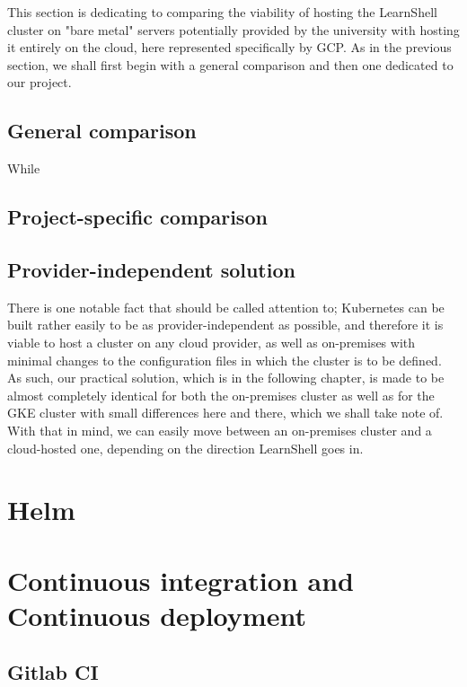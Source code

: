 \documentclass[thesis=B,english]{FITthesis}[2019/12/23]
\begin{document}
This section is dedicating to comparing the viability of hosting the LearnShell cluster on "bare metal" servers potentially provided by the university with hosting it entirely on the cloud, here represented specifically by GCP. As in the previous section, we shall first begin with a general comparison and then one dedicated to our project.

\subsection{General comparison}

While \cite{kube-on-prem}

\subsection{Project-specific comparison}

\subsection{Provider-independent solution}

There is one notable fact that should be called attention to; Kubernetes can be built rather easily to be as provider-independent as possible, and therefore it is viable to host a cluster on any cloud provider, as well as on-premises with minimal changes to the configuration files in which the cluster is to be defined. As such, our practical solution, which is in the following chapter, is made to be almost completely identical for both the on-premises cluster as well as for the GKE cluster with small differences here and there, which we shall take note of. With that in mind, we can easily move between an on-premises cluster and a cloud-hosted one, depending on the direction LearnShell goes in.

\section{Helm}



\section{Continuous integration and Continuous deployment}

\subsection{Gitlab CI}
\end{document}

